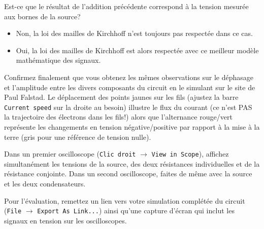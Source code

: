 \documentclass[canadien,12pt,oneside,letterpaper]{article}
\begin{document}
\begin{gradescope}
\begin{gradescope}
        \item Est-ce que le résultat de l'addition précédente correspond à la tension mesurée aux bornes de la source?
        \begin{itemize}[label=$\blacktriangleright$]
            \item Non, la loi des mailles de Kirchhoff n'est toujours pas respectée dans ce cas.
            \item Oui, la loi des mailles de Kirchhoff est alors respectée avec ce meilleur modèle mathématique des signaux.
        \end{itemize}
        \item Confirmez finalement que vous obtenez les mêmes observations sur le déphasage et l'amplitude entre les divers composants du circuit en le simulant sur le site de Paul Falstad. Le déplacement des points jaunes sur les fils (ajustez la barre \texttt{Current speed} sur la droite au besoin) illustre le flux du courant (ce n'est PAS la trajectoire des électrons dans les fils!) alors que l'alternance rouge/vert représente les changements en tension négative/positive par rapport à la mise à la terre (gris pour une référence de tension nulle).\par
        Dans un premier oscilloscope (\texttt{Clic droit} $\rightarrow$ \texttt{View in Scope}), affichez simultanément les tensions de la source, des deux résistances individuelles et de la résistance conjointe. Dans un second oscilloscope, faites de même avec la source et les deux condensateurs.\par
        Pour l'évaluation, remettez un lien vers votre simulation complétée du circuit (\texttt{File} $\rightarrow$ \texttt{Export As Link...}) ainsi qu'une capture d'écran qui inclut les signaux en tension sur les oscilloscopes.\par
        \noindent{}

\end{gradescope}
\end{gradescope}
\end{document}

